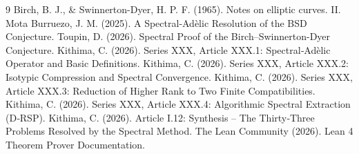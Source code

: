 \documentclass[11pt,a4paper]{article}
\begin{document}

\begin{thebibliography}{9}
  Birch, B. J., \& Swinnerton-Dyer, H. P. F. (1965). Notes on elliptic curves. II.
  Mota Burruezo, J. M. (2025). A Spectral‑Adèlic Resolution of the BSD Conjecture.
  Toupin, D. (2026). Spectral Proof of the Birch–Swinnerton-Dyer Conjecture.
  Kithima, C. (2026). Series XXX, Article XXX.1: Spectral‑Adèlic Operator and Basic Definitions.
  Kithima, C. (2026). Series XXX, Article XXX.2: Isotypic Compression and Spectral Convergence.
  Kithima, C. (2026). Series XXX, Article XXX.3: Reduction of Higher Rank to Two Finite Compatibilities.
  Kithima, C. (2026). Series XXX, Article XXX.4: Algorithmic Spectral Extraction (D‑RSP).
  Kithima, C. (2026). Article I.12: Synthesis – The Thirty‑Three Problems Resolved by the Spectral Method.
  The Lean Community (2026). Lean 4 Theorem Prover Documentation.
\end{thebibliography}
\end{document}

